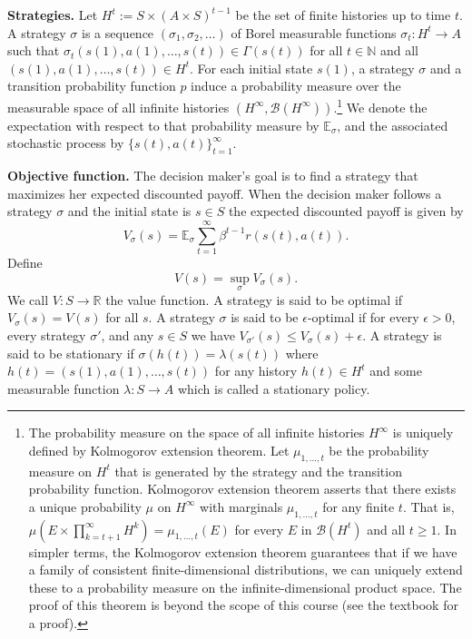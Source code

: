 \documentclass[letter,11pt]{article}
\begin{document}
\textbf{Strategies.} Let $H^{t}:= S \times (A \times S)^{t-1} $ be the set of finite histories up to time $t$. A strategy $\sigma$ is a sequence $(\sigma _{1} ,\sigma _{2} , \ldots )$ of Borel measurable functions $\sigma _{t} : H^{t} \rightarrow A$ such that $\sigma _{t}(s(1) ,a(1) ,\ldots  ,s(t)) \in \Gamma (s(t))$ for all $t \in \mathbb{N}$ and all $(s(1) ,a(1) ,\ldots  ,s(t))\in H^{t}$. For each initial state $s\left (1\right )$, a strategy $\sigma $ and a transition probability function $p$ induce a probability measure 
 over the measurable space of all infinite histories $(H^{\infty },\mathcal{B}(H^{\infty }))$.\protect\footnote{
The probability measure on the space of all infinite histories $H^{\infty }$ is uniquely defined by Kolmogorov extension theorem.   Let $\mu _{{1}, \ldots , t }$ be the probability measure on $H^{t}$ that is generated by the strategy and the transition probability function. Kolmogorov extension theorem asserts that there exists a unique probability $\mu$ on $H^{\infty}$ with marginals $\mu _{{1}, \ldots , t }$ for any finite $t$. That is, $\mu (E \times \prod _{k=t+1}^{\infty} H^{k} ) = \mu _{{1}, \ldots , t }(E)$ for every $E$ in $\mathcal{B}(H^{t})$ and all $t \geq 1$. In simpler terms, the Kolmogorov extension theorem guarantees that if we have a family of consistent finite-dimensional distributions, we can uniquely extend these to a probability measure on the infinite-dimensional product space. The proof of this theorem is beyond the scope of this course (see  the textbook \cite{dudley2018real} for a proof). 
} We denote the expectation with respect to that probability measure by $\mathbb{E}_{\sigma }$, and the associated stochastic process by $\{s(t) ,a(t)\}_{t =1}^{\infty }$. 


\textbf{Objective function.} The decision maker's goal is to find a strategy that maximizes her expected discounted payoff. When the decision maker follows a strategy $\sigma$ and the initial state is $s \in S$ the expected discounted payoff is given by
\begin{equation*}V_{\sigma}(s) =\mathbb{E}_{\sigma }\sum \limits_{t =1}^{\infty }\beta^{t -1}r(s(t),a(t)).
\end{equation*}Define \begin{equation*}V(s) =\sup _{\sigma }V_{\sigma }(s).
\end{equation*}
We call $V :S \rightarrow \mathbb{R}$ the value function. A strategy is said to be optimal if $V_{\sigma} (s) = V(s)$ for all $s$.  A strategy $\sigma$ is said to be $\epsilon$-optimal if for every $\epsilon >0$, every strategy $\sigma'$, and any $s\in S$ we have $V_{\sigma'}(s) \leq V_{\sigma}(s) + \epsilon$. A strategy is said to be stationary if $\sigma (h(t)) = \lambda(s(t))$ where $h(t) = (s(1),a(1),\ldots,s(t) )$ for any history $h(t) \in H^{t}$ and some measurable function $\lambda:S \rightarrow A$ which is called a stationary policy. 
\end{document}
